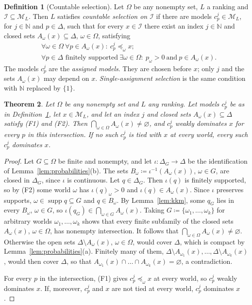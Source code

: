 \documentclass[11pt]{article}
\newtheorem{theorem}{Theorem}[section]
\theoremstyle{definition}
\newtheorem{definition}[theorem]{Definition}
\theoremstyle{remark}
\newcommand{\M}{\mathcal M}
\newcommand{\I}{\mathcal I}
\newcommand{\supp}{\operatorname{supp}}
\begin{document}
\begin{definition}[Countable selection]\label{def:selection}\label{def:family}
Let $\Omega$ be any nonempty set, $L$ a ranking and $\I\subseteq\M_L$. Then $L$ satisfies \emph{countable selection on $\I$} if there are models $c^j_p\in\M_L$, for $j\in\mathbb N$ and $p\in\Delta$, such that for every $x\in\I$ there exist an index $j\in\mathbb N$ and closed sets $A_\omega(x)\subseteq\Delta$, $\omega\in\Omega$, satisfying
\begin{align}
&\forall\omega\in\Omega\ \forall p\in A_\omega(x):\ c^j_p\preceq_\omega x;\tag{F1}\label{eq:f-comparison}\\
&\forall p\in\Delta\text{ finitely supported}\ \exists\omega\in\Omega:\ p_\omega>0\ \text{and}\ p\in A_\omega(x).\tag{F2}\label{eq:f-support}
\end{align}
The models $c^j_p$ are the \emph{assigned models}. They are chosen before $x$; only $j$ and the sets $A_\omega(x)$ may depend on $x$. \emph{Single-assignment selection} is the same condition with $\mathbb N$ replaced by $\{1\}$.
\end{definition}
\begin{theorem}\label{thm:general}
Let $\Omega$ be any nonempty set and $L$ any ranking. Let models $c^j_p$ be as in Definition~\ref{def:selection}, let $x\in\M_L$, and let an index $j$ and closed sets $A_\omega(x)\subseteq\Delta$ satisfy (F1) and (F2). Then $\bigcap_{\omega\in\Omega}A_\omega(x)\ne\varnothing$, and $c^j_p$ weakly dominates $x$ for every $p$ in this intersection. If no such $c^j_p$ is tied with $x$ at every world, every such $c^j_p$ dominates $x$.
\end{theorem}
\begin{proof}
Let $G\subseteq\Omega$ be finite and nonempty, and let $\iota:\Delta_G\to\Delta$ be the identification of Lemma~\ref{lem:probabilities}(b). The sets $B_\omega\coloneqq\iota^{-1}(A_\omega(x))$, $\omega\in G$, are closed in $\Delta_G$, since $\iota$ is continuous. Let $q\in\Delta_G$. Then $\iota(q)$ is finitely supported, so by (F2) some world $\omega$ has $\iota(q)_\omega>0$ and $\iota(q)\in A_\omega(x)$. Since $\iota$ preserves supports, $\omega\in\supp q\subseteq G$ and $q\in B_\omega$. By Lemma~\ref{lem:kkm}, some $q_G$ lies in every $B_\omega$, $\omega\in G$, so $\iota(q_G)\in\bigcap_{\omega\in G}A_\omega(x)$. Taking $G\coloneqq\{\omega_1,\dots,\omega_k\}$ for arbitrary worlds $\omega_1,\dots,\omega_k$ shows that every finite subfamily of the closed sets $A_\omega(x)$, $\omega\in\Omega$, has nonempty intersection. It follows that $\bigcap_{\omega\in\Omega}A_\omega(x)\ne\varnothing$. Otherwise the open sets $\Delta\setminus A_\omega(x)$, $\omega\in\Omega$, would cover $\Delta$, which is compact by Lemma~\ref{lem:probabilities}(a). Finitely many of them, $\Delta\setminus A_{\omega_1}(x),\dots,\Delta\setminus A_{\omega_k}(x)$, would then cover $\Delta$, so that $A_{\omega_1}(x)\cap\dots\cap A_{\omega_k}(x)=\varnothing$, a contradiction.

For every $p$ in the intersection, (F1) gives $c^j_p\preceq_\omega x$ at every world, so $c^j_p$ weakly dominates $x$. If, moreover, $c^j_p$ and $x$ are not tied at every world, $c^j_p$ dominates $x$.
\end{proof}
\end{document}
